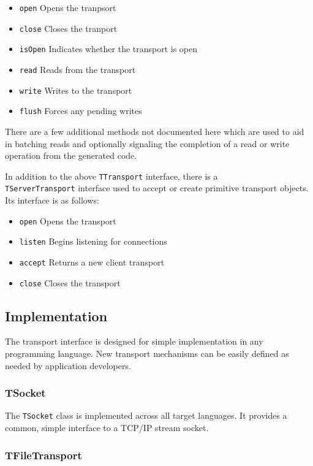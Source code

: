 \documentclass[nocopyrightspace,blockstyle]{sigplanconf}
\begin{document}
\begin{itemize}
\item \texttt{open} Opens the tranpsort
\item \texttt{close} Closes the tranport
\item \texttt{isOpen} Indicates whether the transport is open
\item \texttt{read} Reads from the transport
\item \texttt{write} Writes to the transport
\item \texttt{flush} Forces any pending writes
\end{itemize}

There are a few additional methods not documented here which are used to aid
in batching reads and optionally signaling the completion of a read or
write operation from the generated code.

In addition to the above
\texttt{TTransport} interface, there is a\\
\texttt{TServerTransport} interface
used to accept or create primitive transport objects. Its interface is as
follows:

\begin{itemize}
\item \texttt{open} Opens the transport
\item \texttt{listen} Begins listening for connections
\item \texttt{accept} Returns a new client transport
\item \texttt{close} Closes the transport
\end{itemize}

\subsection{Implementation}

The transport interface is designed for simple implementation in any
programming language. New transport mechanisms can be easily defined as needed
by application developers.

\subsubsection{TSocket}

The \texttt{TSocket} class is implemented across all target languages. It
provides a common, simple interface to a TCP/IP stream socket.

\subsubsection{TFileTransport}
\end{document}
